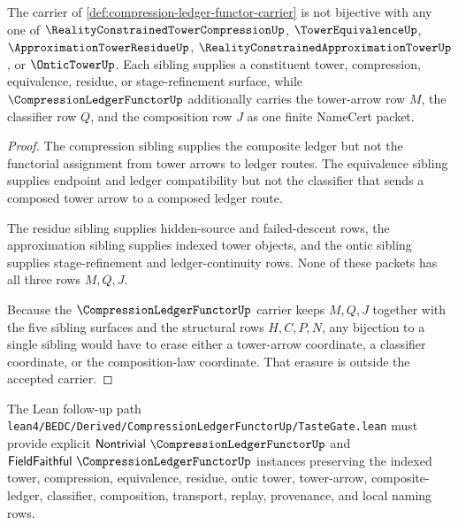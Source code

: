 \begin{theorem}
\label{thm:compression-ledger-functor-sibling-independence}
The carrier of \autoref{def:compression-ledger-functor-carrier} is not bijective with any one of $\RealityConstrainedTowerCompressionUp$, $\TowerEquivalenceUp$, $\ApproximationTowerResidueUp$, $\RealityConstrainedApproximationTowerUp$, or $\OnticTowerUp$. Each sibling supplies a constituent tower, compression, equivalence, residue, or stage-refinement surface, while $\CompressionLedgerFunctorUp$ additionally carries the tower-arrow row $M$, the classifier row $Q$, and the composition row $J$ as one finite NameCert packet.
\end{theorem}
\begin{proof}
The compression sibling supplies the composite ledger but not the functorial assignment from tower arrows to ledger routes. The equivalence sibling supplies endpoint and ledger compatibility but not the classifier that sends a composed tower arrow to a composed ledger route.

The residue sibling supplies hidden-source and failed-descent rows, the approximation sibling supplies indexed tower objects, and the ontic sibling supplies stage-refinement and ledger-continuity rows. None of these packets has all three rows $M,Q,J$.

Because the $\CompressionLedgerFunctorUp$ carrier keeps $M,Q,J$ together with the five sibling surfaces and the structural rows $H,C,P,N$, any bijection to a single sibling would have to erase either a tower-arrow coordinate, a classifier coordinate, or the composition-law coordinate. That erasure is outside the accepted carrier.
\end{proof}

The Lean follow-up path \texttt{lean4/BEDC/Derived/CompressionLedgerFunctorUp/TasteGate.lean} must provide explicit $\mathsf{Nontrivial}\ \CompressionLedgerFunctorUp$ and $\mathsf{FieldFaithful}\ \CompressionLedgerFunctorUp$ instances preserving the indexed tower, compression, equivalence, residue, ontic tower, tower-arrow, composite-ledger, classifier, composition, transport, replay, provenance, and local naming rows.


